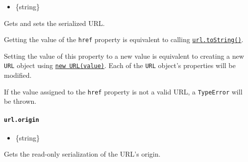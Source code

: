 \begin{itemize}
\tightlist
\item
  \{string\}
\end{itemize}

Gets and sets the serialized URL.

\begin{Shaded}
\begin{Highlighting}[]
\OperatorTok{=}  \NormalTok{(}\NormalTok{)}\OperatorTok{;}
\NormalTok{)}\OperatorTok{;}

 \OperatorTok{=} \OperatorTok{;}
\NormalTok{)}\OperatorTok{;}
\end{Highlighting}
\end{Shaded}

Getting the value of the \texttt{href} property is equivalent to calling
\hyperref[urltostring]{\texttt{url.toString()}}.

Setting the value of this property to a new value is equivalent to
creating a new \texttt{URL} object using
\hyperref[new-urlinput-base]{\texttt{new\ URL(value)}}. Each of the
\texttt{URL} object's properties will be modified.

If the value assigned to the \texttt{href} property is not a valid URL,
a \texttt{TypeError} will be thrown.

\paragraph{\texorpdfstring{\texttt{url.origin}}{url.origin}}\label{url.origin}

\begin{itemize}
\tightlist
\item
  \{string\}
\end{itemize}

Gets the read-only serialization of the URL's origin.

\begin{Shaded}
\begin{Highlighting}[]
\OperatorTok{=}  \NormalTok{(}\NormalTok{)}\OperatorTok{;}
\NormalTok{)}\OperatorTok{;}
\end{Highlighting}
\end{Shaded}

